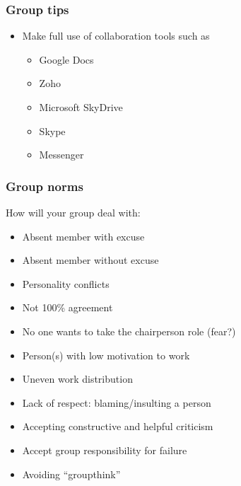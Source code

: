 \begin{frame}\frametitle{Group tips}
	\begin{itemize}
		\item	Make full use of collaboration tools such as
		\begin{itemize}
			\item	Google Docs
			\item	Zoho
			\item	Microsoft SkyDrive
			\item	Skype
			\item	Messenger
		\end{itemize}
	\end{itemize}
\end{frame}

\begin{frame}\frametitle{Group norms}
	How will your group deal with:
	\begin{itemize}
		\item	Absent member with excuse
		\item	Absent member without excuse
		\item	Personality conflicts
		\item	Not 100\% agreement
		\item	No one wants to take the chairperson role (fear?)
		\item	Person(s) with low motivation to work
		\item	Uneven work distribution
		\item	Lack of respect: blaming/insulting a person
		\item	Accepting constructive and helpful criticism
		\item	Accept group responsibility for failure
		\item	Avoiding ``groupthink''
	\end{itemize}
\end{frame}
